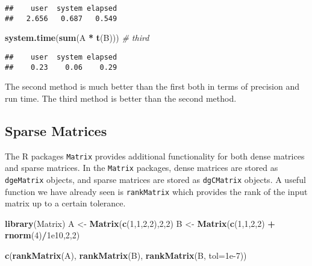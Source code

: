 \documentclass[]{article}
\newenvironment{Shaded}{\begin{snugshade}}{\end{snugshade}}
\newcommand{\CommentTok}[1]{\textcolor[rgb]{0.56,0.35,0.01}{\textit{#1}}}
\newcommand{\DataTypeTok}[1]{\textcolor[rgb]{0.13,0.29,0.53}{#1}}
\newcommand{\DecValTok}[1]{\textcolor[rgb]{0.00,0.00,0.81}{#1}}
\newcommand{\FloatTok}[1]{\textcolor[rgb]{0.00,0.00,0.81}{#1}}
\newcommand{\KeywordTok}[1]{\textcolor[rgb]{0.13,0.29,0.53}{\textbf{#1}}}
\newcommand{\NormalTok}[1]{#1}
\newcommand{\OperatorTok}[1]{\textcolor[rgb]{0.81,0.36,0.00}{\textbf{#1}}}
\newcommand{\StringTok}[1]{\textcolor[rgb]{0.31,0.60,0.02}{#1}}
\begin{document}
\begin{verbatim}
##    user  system elapsed 
##   2.656   0.687   0.549
\end{verbatim}

\begin{Shaded}
\begin{Highlighting}[]
\KeywordTok{system.time}\NormalTok{(}\KeywordTok{sum}\NormalTok{(A }\OperatorTok{*}\StringTok{ }\KeywordTok{t}\NormalTok{(B)))      }\CommentTok{# third}
\end{Highlighting}
\end{Shaded}

\begin{verbatim}
##    user  system elapsed 
##    0.23    0.06    0.29
\end{verbatim}

The second method is much better than the first both in terms of
precision and run time. The third method is better than the second
method.

\hypertarget{sparse-matrices}{%
\subsection{Sparse Matrices}\label{sparse-matrices}}

The R packages \texttt{Matrix} provides additional functionality for
both dense matrices and sparse matrices. In the \texttt{Matrix}
packages, dense matrices are stored as \texttt{dgeMatrix} objects, and
sparse matrices are stored as \texttt{dgCMatrix} objects. A useful
function we have already seen is \texttt{rankMatrix} which provides the
rank of the input matrix up to a certain tolerance.

\begin{Shaded}
\begin{Highlighting}[]
\KeywordTok{library}\NormalTok{(Matrix)}
\NormalTok{A <-}\StringTok{ }\KeywordTok{Matrix}\NormalTok{(}\KeywordTok{c}\NormalTok{(}\DecValTok{1}\NormalTok{,}\DecValTok{1}\NormalTok{,}\DecValTok{2}\NormalTok{,}\DecValTok{2}\NormalTok{),}\DecValTok{2}\NormalTok{,}\DecValTok{2}\NormalTok{)}
\NormalTok{B <-}\StringTok{ }\KeywordTok{Matrix}\NormalTok{(}\KeywordTok{c}\NormalTok{(}\DecValTok{1}\NormalTok{,}\DecValTok{1}\NormalTok{,}\DecValTok{2}\NormalTok{,}\DecValTok{2}\NormalTok{) }\OperatorTok{+}\StringTok{ }\KeywordTok{rnorm}\NormalTok{(}\DecValTok{4}\NormalTok{)}\OperatorTok{/}\FloatTok{1e10}\NormalTok{,}\DecValTok{2}\NormalTok{,}\DecValTok{2}\NormalTok{)}

\KeywordTok{c}\NormalTok{(}\KeywordTok{rankMatrix}\NormalTok{(A), }\KeywordTok{rankMatrix}\NormalTok{(B), }\KeywordTok{rankMatrix}\NormalTok{(B, }\DataTypeTok{tol=}\FloatTok{1e-7}\NormalTok{))}
\end{Highlighting}
\end{Shaded}
\end{document}
